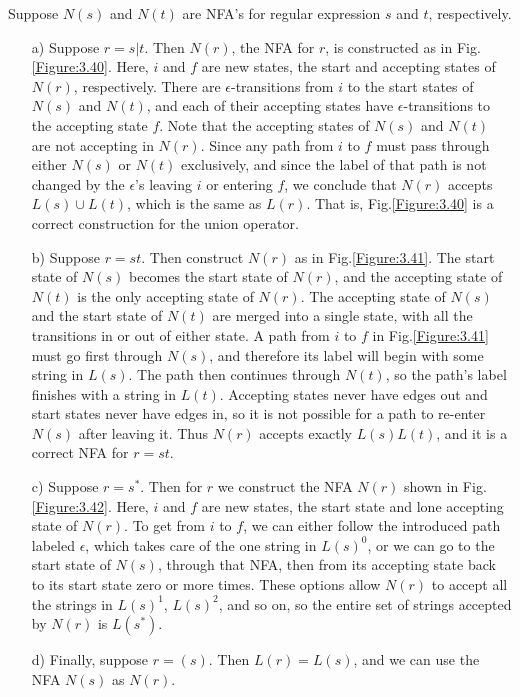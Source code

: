 \documentclass[12pt,a4paper,twoside,openany]{book}
\begin{document}
{     Suppose $N(s)$ and $N(t)$ are NFA's for regular expression $s$ and $t$, respectively.
    \begin{itemize}
        \item[a)] Suppose $r=s|t$. Then $N(r)$, the NFA for $r$, is constructed as in Fig.\;\ref{Figure:3.40}. Here, $i$ and $f$ are new states, the start and accepting states of $N(r)$, respectively. There are $\epsilon$-transitions from $i$ to the start states of $N(s)$ and $N(t)$, and each of their accepting states have $\epsilon$-transitions to the accepting state $f$. Note that the accepting states of $N(s)$ and $N(t)$ are not accepting in $N(r)$. Since any path from $i$ to $f$ must pass through either $N(s)$ or $N(t)$ exclusively, and since the label of that path is not changed by the $\epsilon$'s leaving $i$ or entering $f$, we conclude that $N(r)$ accepts $L(s)\cup L(t)$, which is the same as $L(r)$. That is, Fig.\;\ref{Figure:3.40} is a correct construction for the union operator.
        \item[b)] Suppose $r=st$. Then construct $N(r)$ as in Fig.\;\ref{Figure:3.41}. The start state of $N(s)$ becomes the start state of $N(r)$, and the accepting state of $N(t)$ is the only accepting state of $N(r)$. The accepting state of $N(s)$ and the start state of $N(t)$ are merged into a single state, with all the transitions in or out of either state. A path from $i$ to $f$ in Fig.\;\ref{Figure:3.41} must go first through $N(s)$, and therefore its label will begin with some string in $L(s)$. The path then continues through $N(t)$, so the path's label finishes with a string in $L(t)$. Accepting states never have edges out and start states never have edges in, so it is not possible for a path to re-enter $N(s)$ after leaving it. Thus $N(r)$ accepts exactly $L(s)L(t)$, and it is a correct NFA for $r=st$.
        \item[c)] Suppose $r=s^*$. Then for $r$ we construct the NFA $N(r)$ shown in Fig.\;\ref{Figure:3.42}. Here, $i$ and $f$ are new states, the start state and lone accepting state of $N(r)$. To get from $i$ to $f$, we can either follow the introduced path labeled $\epsilon$, which takes care of the one string in $L(s)^0$, or we can go to the start state of $N(s)$, through that NFA, then from its accepting state back to its start state zero or more times. These options allow $N(r)$ to accept all the strings in $L(s)^1$, $L(s)^2$, and so on, so the entire set of strings accepted by $N(r)$ is $L(s^*)$.
        \item[d)] Finally, suppose $r=(s)$. Then $L(r)=L(s)$, and we can use the NFA $N(s)$ as $N(r)$.
    \end{itemize}
}
\end{document}
